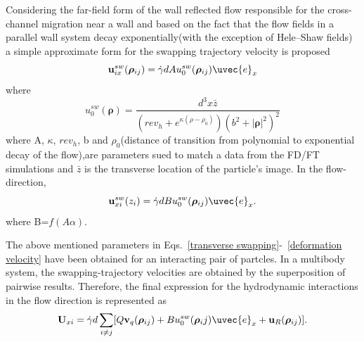 Considering the far-field form of the wall reflected flow responsible for the cross-channel migration near a wall\cite{Reference27} and based on the fact that the flow fields in a parallel wall system decay exponentially(with the exception of Hele--Shaw fields) a simple approximate form for the swapping trajectory velocity is proposed
\begin{equation}
  \mathbf{u}_{ix}^{sw}(\bm{\rho}_{ij}) = \dot{\gamma}dAu_0^{sw}(\bm{\rho}_{ij}) \uvec{e}_x
  \label{transverse swapping}
\end{equation}
where
\begin{equation}
  u_0^{sw}(\bm{\rho}) = \frac{d^3x \bar{z}}{(rev_h + e^{\kappa(\rho-\rho_0)})(b^2 +  \left|\bm{\rho}\right|^2)^2}
  \label{swapping form}
\end{equation}
where A, $\kappa$, $rev_h$, b and $\rho_0$(distance of transition from polynomial to exponential decay of the flow),are parameters sued to match a data from the FD/FT simulations and $\bar{z}$ is the transverse location of the particle's image.
In the flow-direction, 
\begin{equation}
 \mathbf{u}_{xi}^{sw}(z_i) = \dot{\gamma}dBu_0^{sw}(\bm{\rho}_{ij}) \uvec{e}_x.
\end{equation}
where B=$f(A \alpha)$.

The above mentioned parameters in Eqs.~\ref{transverse swapping}-~\ref{deformation velocity} have been obtained for an interacting pair of partcles. In a multibody system, the swapping-trajectory velocities are obtained by the superposition of pairwise results.
Therefore, the final expression for the hydrodynamic interactions in the flow direction is represented as
\begin{equation}
 \mathbf{U}_{xi} = \dot{\gamma}d \sum_{i \neq j}[Q\mathbf{v}_q(\bm{\rho}_{ij}) + Bu_0^{sw}(\bm{\rho}_ij) \uvec{e}_x + \mathbf{u}_R(\bm{\rho}_{ij})].
  \label{total flow}
\end{equation}

